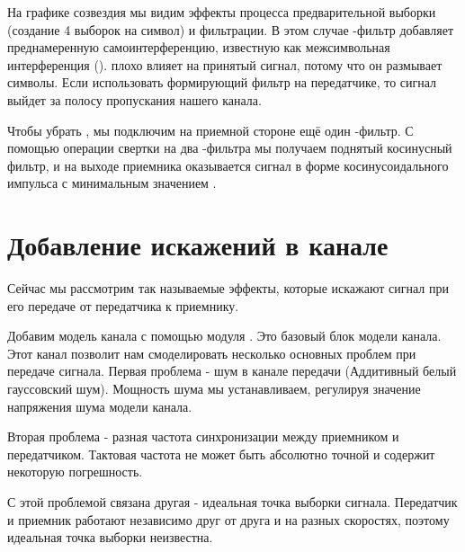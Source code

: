 \documentclass[a4paper, 12pt]{report}
\begin{document}
	На графике созвездия мы видим эффекты процесса предварительной выборки (создание 4 выборок на символ) и фильтрации. В этом случае -фильтр добавляет преднамеренную самоинтерференцию, известную как межсимвольная интерференция ().  плохо влияет на принятый сигнал, потому что он размывает символы. Если использовать формирующий фильтр на передатчике, то сигнал выйдет за полосу пропускания нашего канала.
	
	Чтобы убрать , мы подключим на приемной стороне ещё один -фильтр. С помощью операции свертки на два -фильтра мы получаем поднятый косинусный фильтр, и на выходе приемника оказывается сигнал в форме косинусоидального импульса с минимальным значением .

	\chapter{Добавление искажений в канале}
	Сейчас мы рассмотрим так называемые  эффекты, которые искажают сигнал при его передаче от передатчика к приемнику.
	
	Добавим модель канала с помощью модуля . Это базовый блок модели канала. 
	Этот канал позволит нам смоделировать несколько основных проблем при передаче сигнала. Первая проблема - шум в канале передачи (Аддитивный белый гауссовский шум). Мощность шума мы устанавливаем, регулируя значение напряжения шума модели канала. 
	
	Вторая проблема - разная частота синхронизации между приемником и передатчиком. Тактовая частота не может быть абсолютно точной и содержит некоторую погрешность. 
	
	С этой проблемой связана другая - идеальная точка выборки сигнала. Передатчик и приемник работают независимо друг от друга и на разных скоростях, поэтому идеальная точка выборки неизвестна.
	
\end{document}
